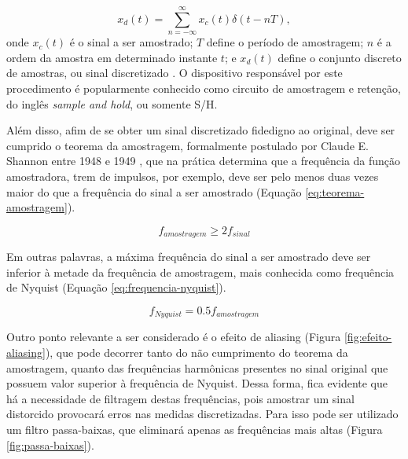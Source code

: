 \documentclass[oneside,openright,12pt]{ufsm_2015} %
\begin{document}
\begin{equation}\label{eq:amostragem}
    x_{d}(t) = \sum\limits_{n = -\infty}^\infty x_{c}(t)\delta(t-nT),
\end{equation}
onde $x_{c}(t)$ é o sinal a ser amostrado; $T$ define o período de amostragem;  $n$ é a ordem da amostra em determinado instante $t$; e $x_{d}(t)$ define o conjunto discreto de amostras, ou sinal discretizado \cite{livro:discrete-time-signal-processing}. O dispositivo responsável por este procedimento é popularmente conhecido como circuito de amostragem e retenção, do inglês \textit{sample and hold}, ou somente S/H.

Além disso, afim de se obter um sinal discretizado fidedigno ao original, deve ser cumprido o teorema da amostragem, formalmente postulado por Claude E. Shannon entre 1948 e 1949 \cite{luke1999origins}, que na prática determina que a frequência da função amostradora, trem de impulsos, por exemplo, deve ser pelo menos duas vezes maior do que a frequência do sinal a ser amostrado (Equação \ref{eq:teorema-amostragem}). 

\begin{equation}\label{eq:teorema-amostragem}
    f_{amostragem} \geq 2f_{sinal}
\end{equation}

Em outras palavras, a máxima frequência do sinal a ser amostrado deve ser inferior à metade da frequência de amostragem, mais conhecida como frequência de Nyquist (Equação \ref{eq:frequencia-nyquist}).

\begin{equation}\label{eq:frequencia-nyquist}
    f_{Nyquist} = 0.5f_{amostragem}
\end{equation}

Outro ponto relevante a ser considerado é o efeito de aliasing (Figura \ref{fig:efeito-aliasing}), que pode decorrer tanto do não cumprimento do teorema da amostragem, quanto das frequências harmônicas presentes no sinal original que possuem valor superior à frequência de Nyquist. Dessa forma, fica evidente que há a necessidade de filtragem destas frequências, pois amostrar um sinal distorcido provocará erros nas medidas discretizadas. Para isso pode ser utilizado um filtro passa-baixas, que eliminará apenas as frequências mais altas (Figura \ref{fig:passa-baixas}).
\end{document}
